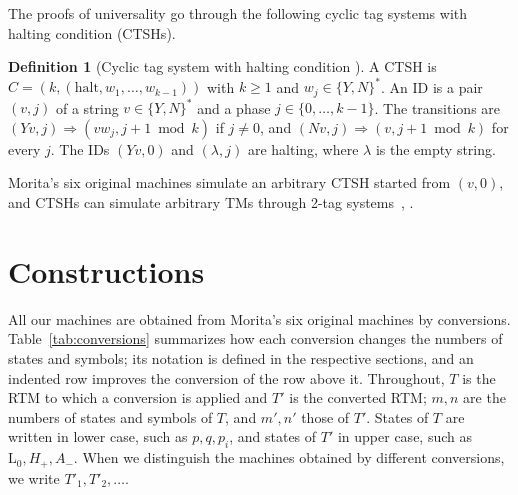 \documentclass{article}
\theoremstyle{definition}
\newtheorem{definition}[theorem]{Definition}
\theoremstyle{remark}
\newcommand{\rmL}{\mathrm{L}}
\begin{document}
The proofs of universality go through the following cyclic tag systems with halting condition (CTSHs).

\begin{definition}[Cyclic tag system with halting condition {\cite[Def.~7.5]{Morita17}}]
A CTSH is $\hat C=(k,(\mathrm{halt},w_1,\dots,w_{k-1}))$ with $k\ge 1$ and $w_j\in\{Y,N\}^*$.
An ID is a pair $(v,j)$ of a string $v\in\{Y,N\}^*$ and a phase $j\in\{0,\dots,k-1\}$.
The transitions are $(Yv,j)\Rightarrow(vw_j,j+1\bmod k)$ if $j\ne 0$, and $(Nv,j)\Rightarrow(v,j+1\bmod k)$ for every $j$.
The IDs $(Yv,0)$ and $(\lambda,j)$ are halting, where $\lambda$ is the empty string.
\end{definition}

Morita's six original machines simulate an arbitrary CTSH started from $(v,0)$, and CTSHs can simulate arbitrary TMs through 2-tag systems~\cite{CockeMinsky64}, \cite[Sect.~7.2]{Morita17}.

\section{Constructions}
\label{sec:constr}

All our machines are obtained from Morita's six original machines by conversions.
Table~\ref{tab:conversions} summarizes how each conversion changes the numbers of states and symbols; its notation is defined in the respective sections, and an indented row improves the conversion of the row above it.
Throughout, $T$ is the RTM to which a conversion is applied and $T'$ is the converted RTM; $m,n$ are the numbers of states and symbols of $T$, and $m',n'$ those of $T'$.
States of $T$ are written in lower case, such as $p,q,p_i$, and states of $T'$ in upper case, such as $\rmL_0,H_+,A_-$.
When we distinguish the machines obtained by different conversions, we write $T'_1,T'_2,\dots$.
\end{document}
